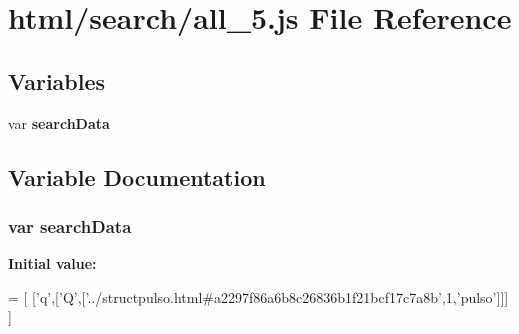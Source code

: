 \section{html/search/all\+\_\+5.js File Reference}
\label{all__5_8js}
\subsection*{Variables}
\begin{DoxyCompactItemize}
\item 
var {\bf search\+Data}
\end{DoxyCompactItemize}


\subsection{Variable Documentation}
\subsubsection[{search\+Data}]{\setlength{\rightskip}{0pt plus 5cm}var search\+Data}\label{all__5_8js_ad01a7523f103d6242ef9b0451861231e}
{\bfseries Initial value\+:}
\begin{DoxyCode}
=
[
  [\textcolor{charliteral}{'q'},[\textcolor{charliteral}{'Q'},[\textcolor{stringliteral}{'../structpulso.html#a2297f86a6b8c26836b1f21bcf17c7a8b'},1,\textcolor{stringliteral}{'pulso'}]]]
]
\end{DoxyCode}
